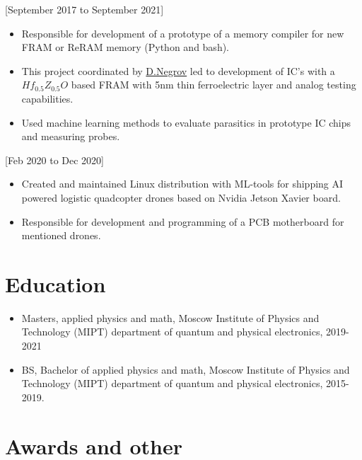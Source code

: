 \documentclass{article}
\begin{document}
[September 2017 to September 2021]
\begin{itemize}
\item Responsible for development of a prototype of a memory  compiler for new FRAM or ReRAM memory (Python and bash).
\item This project coordinated by  \href{https://www.scopus.com/authid/detail.uri?authorId=56272708000}{D.Negrov} led to development of IC's with a $Hf_{0.5} Z_{0.5} O $ based  FRAM with 5nm thin ferroelectric layer and analog testing capabilities.
\item Used machine learning methods to evaluate parasitics in prototype IC chips and measuring probes.
\end{itemize}

[Feb 2020 to Dec 2020]
\begin{itemize}
\item Created and maintained Linux distribution with ML-tools for shipping AI powered logistic quadcopter drones based on Nvidia Jetson Xavier board.
\item Responsible for development and programming of a PCB motherboard for mentioned drones.
\end{itemize}
 
 
\section{Education}
 
\begin{itemize}
\item Masters, applied physics and math, Moscow Institute of Physics and Technology (MIPT) department of quantum and physical electronics, 2019-2021
\item BS, Bachelor of applied physics and math, Moscow Institute of Physics and Technology (MIPT) department of quantum and physical electronics, 2015-2019.
\end{itemize}
 
\section{Awards and other}
 
\end{document}
